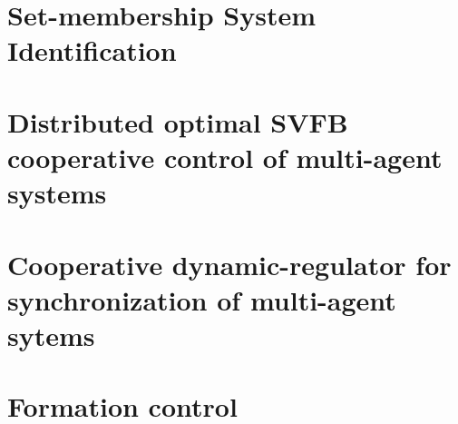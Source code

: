 \documentclass[a4paper, 12pt]{report}
\begin{document}
\chapter{Set-membership System Identification}


\chapter{Distributed optimal SVFB cooperative control of multi-agent systems}


\chapter{Cooperative dynamic-regulator for synchronization of multi-agent sytems}


\chapter{Formation control}
\end{document}
